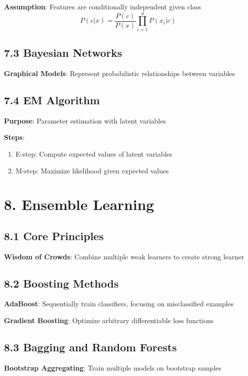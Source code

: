 \documentclass{amsart}
\theoremstyle{plain}
\theoremstyle{definition}
\theoremstyle{remark}
\begin{document}
\textbf{Assumption}: Features are conditionally independent given class
\[
P(c|x) = \frac{P(c)}{P(x)} \prod_{i=1}^d P(x_i|c)
\]

\subsection{7.3 Bayesian Networks}

\textbf{Graphical Models}: Represent probabilistic relationships between variables

\subsection{7.4 EM Algorithm}

\textbf{Purpose}: Parameter estimation with latent variables

\textbf{Steps}:

\begin{enumerate}
	\item E-step: Compute expected values of latent variables
	\item M-step: Maximize likelihood given expected values
\end{enumerate}

\section{8. Ensemble Learning}

\subsection{8.1 Core Principles}

\textbf{Wisdom of Crowds}: Combine multiple weak learners to create strong learner

\subsection{8.2 Boosting Methods}

\textbf{AdaBoost}: Sequentially train classifiers, focusing on misclassified examples

\textbf{Gradient Boosting}: Optimize arbitrary differentiable loss functions

\subsection{8.3 Bagging and Random Forests}

\textbf{Bootstrap Aggregating}: Train multiple models on bootstrap samples
\end{document}
